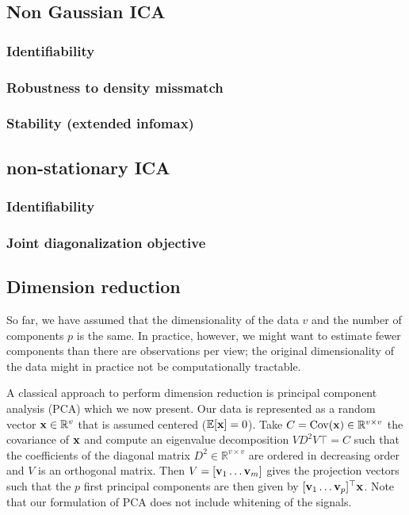 \documentclass{report}
\begin{document}
\subsection{Non Gaussian ICA}
\subsubsection{Identifiability}
\subsubsection{Robustness to density missmatch}
\subsubsection{Stability (extended infomax)}
\subsection{non-stationary ICA}
\subsubsection{Identifiability}
\subsubsection{Joint diagonalization objective}
\subsection{Dimension reduction}
So far, we have assumed that the dimensionality of the data $v$ and the number
of components $p$ is the same. 
In practice, however, we might want to estimate fewer components than there are observations per view; the original dimensionality of the data %
might in practice not be computationally tractable.


A classical approach to perform dimension reduction is principal component
analysis (PCA) which we now present.
Our data is represented as a random vector $\mathbf{x} \in \mathbb{R}^v$ that is assumed
centered ($\mathbb{E}[\mathbf{x}] = 0$). Take $C = \operatorname*{Cov}(\mathbf{x}) \in \mathbb{R}^{v \times v}$ the
covariance of $\mathbf{x}$ and compute an eigenvalue decomposition $VD^2V {\top} = C$
such that the coefficients of the diagonal matrix $D^2 \in \mathbb{R}^{v
  \times v}$ are ordered in decreasing order and $V$ is an orthogonal matrix.
Then $V = [\mathbf{v}_1 \dots \mathbf{v}_m]$ gives the projection vectors such that the $p$ first
principal components are then given by $[\mathbf{v}_1 \dots \mathbf{v}_p]^{\top} \mathbf{x}$. Note
that our formulation of PCA does not include whitening of the signals.
\end{document}
